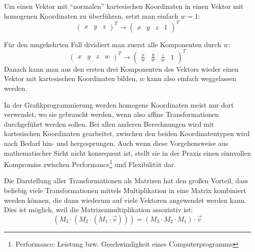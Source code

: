 Um einen Vektor mit \enquote{normalen} kartesischen Koordinaten in einen Vektor mit homogenen Koordinaten zu überführen, setzt man einfach $w = 1$:
\begin{equation}
 \begin{pmatrix} x & y & z \end{pmatrix}^T \rightarrow \begin{pmatrix} x & y & z & 1 \end{pmatrix}^T
\end{equation}

Für den umgekehrten Fall dividiert man zuerst alle Komponenten durch $w$:
\begin{equation}
 \begin{pmatrix} x & y & z & w \end{pmatrix}^T \rightarrow \begin{pmatrix} \frac{x}{w} & \frac{y}{w} & \frac{z}{w} & 1 \end{pmatrix}^T
\end{equation}
Danach kann man aus den ersten drei Komponenten des Vektors wieder einen Vektor mit kartesischen Koordinaten bilden, $w$ kann also einfach weggelassen werden. 

In der Grafikprogrammierung werden homogene Koordinaten meist nur dort verwendet, wo sie gebraucht werden, wenn also affine Transformationen durchgeführt werden sollen. Bei allen anderen Berechnungen wird mit kartesischen Koordinaten gearbeitet,
zwischen den beiden Koordinatentypen wird nach Bedarf hin- und hergesprungen. Auch wenn diese Vorgehensweise aus mathematischer Sicht nicht konsequent ist, stellt sie in der Praxis einen sinnvollen Kompromiss zwischen Performance\footnote{Performance: Leistung bzw. Geschwindigkeit eines Computerprogramms} und Flexibilität dar.

\label{transformationmatrixcombination}
Die Darstellung aller Transformationen als Matrizen hat den großen Vorteil, dass beliebig viele Transformationen mittels Multiplikation in eine Matrix kombiniert werden können, die dann wiederum auf viele Vektoren angewendet werden kann. Dies ist möglich, weil die Matrizenmultiplikation assoziativ ist:
\begin{equation}
 \left( M_3 \cdot \left( M_2 \cdot \left( M_1 \cdot \vec v \right) \right) \right) = \left( M_3 \cdot M_2 \cdot M_1 \right) \cdot \vec v
\end{equation} 

